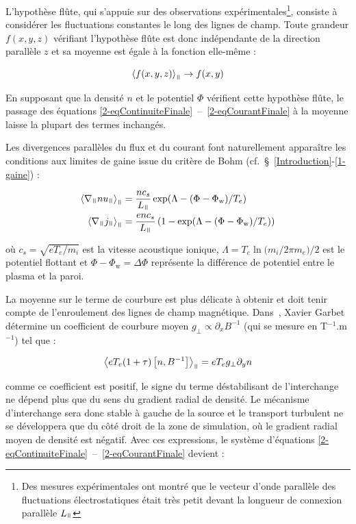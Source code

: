 \begin{refsection}
 L'hypothèse flûte, qui s'appuie sur des observations
expérimentales\footnote{Des mesures expérimentales ont montré que le vecteur
d'onde parallèle des fluctuations électrostatiques était très petit devant la
longueur de connexion parallèle $L_\para$\parencite{Wootton}}, consiste à
considérer les fluctuations constantes le long des lignes de champ. Toute
grandeur $f(x,y,z)$ vérifiant l'hypothèse flûte est donc indépendante de la
direction parallèle $z$ et sa moyenne est égale à la fonction elle-même :

\begin{equation}
\left<f(x,y,z)\right>_\para\rightarrow f(x,y)
\end{equation}

En supposant que la densité $n$ et le potentiel $\Phi$ vérifient cette hypothèse
flûte, le passage des équations
\eqref{2-eqContinuiteFinale}~--~\eqref{2-eqCourantFinale} à la moyenne laisse la plupart des termes inchangés.

Les divergences parallèles du flux et du
courant font naturellement apparaître
les conditions aux limites de gaine issue du critère de Bohm
(cf.~\S~\ref{Introduction}-\ref{1-gaine}) :

\begin{align}
\left<\nabla_\para
nu_\para\right>_\para&=\frac{nc_s}{L_\para}\exp(\Lambda-(\Phi-\Phi_\text{w})/T_e)
\\
\left<\nabla_\para
j_\para\right>_\para&=\frac{enc_s}{L_\para}\left(1-\exp(\Lambda-(\Phi-\Phi_\text{w})/T_e)\right)
\end{align}

où $c_s=\sqrt{eT_e/m_i}$ est la vitesse acoustique
ionique, $\Lambda=T_{e}\ln({m_{i}/2\pi m_{e})/2}$ est le
potentiel flottant et $\Phi-\Phi_\text{w}=\Delta \Phi$ représente la
différence de potentiel entre le plasma et la paroi. 

La moyenne sur le terme de courbure est plus délicate à obtenir et doit tenir
compte de l'enroulement des lignes de champ magnétique.
Dans~\parencite{Garbet}, Xavier Garbet détermine un coefficient de courbure
moyen $g_\perp\propto\partial_xB^{-1}$ (qui se mesure en T$^{-1}$.m$^{-1}$) tel
que :

\begin{equation}
\left<eT_e(1+\tau)\left[n,B^{-1}\right]\right>_\para=eT_eg_\perp\partial_yn
\end{equation}

comme ce coefficient est positif, le signe du terme déstabilisant
de l'interchange ne dépend plus que du sens du gradient
radial de densité. Le mécanisme d'interchange sera donc stable à gauche de la
source et le transport turbulent ne se développera que du côté droit de la zone
de simulation, où le gradient radial moyen de densité est négatif.
Avec ces expressions, le système d'équations \eqref{2-eqContinuiteFinale}~--~\eqref{2-eqCourantFinale} devient :


\end{refsection}

